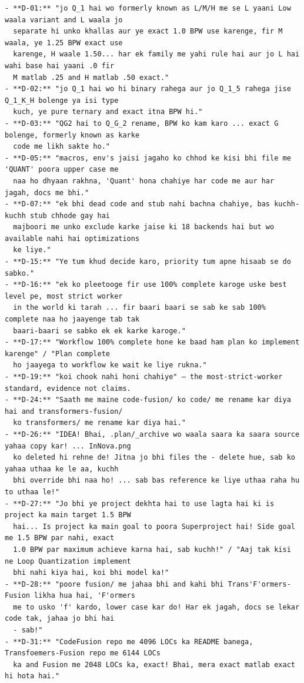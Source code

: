 \begin{Verbatim}[breaklines,breakanywhere,fontsize=\footnotesize]
- **D-01:** "jo Q_1 hai wo formerly known as L/M/H me se L yaani Low waala variant and L waala jo
  separate hi unko khallas aur ye exact 1.0 BPW use karenge, fir M waala, ye 1.25 BPW exact use
  karenge, H waale 1.50... har ek family me yahi rule hai aur jo L hai wahi base hai yaani .0 fir
  M matlab .25 and H matlab .50 exact."
- **D-02:** "jo Q_1 hai wo hi binary rahega aur jo Q_1_5 rahega jise Q_1_K_H bolenge ya isi type
  kuch, ye pure ternary and exact itna BPW hi."
- **D-03:** "QG2 hai to Q_G_2 rename, BPW ko kam karo ... exact G bolenge, formerly known as karke
  code me likh sakte ho."
- **D-05:** "macros, env's jaisi jagaho ko chhod ke kisi bhi file me 'QUANT' poora upper case me
  naa ho dhyaan rakhna, 'Quant' hona chahiye har code me aur har jagah, docs me bhi."
- **D-07:** "ek bhi dead code and stub nahi bachna chahiye, bas kuchh-kuchh stub chhode gay hai
  majboori me unko exclude karke jaise ki 18 backends hai but wo available nahi hai optimizations
  ke liye."
- **D-15:** "Ye tum khud decide karo, priority tum apne hisaab se do sabko."
- **D-16:** "ek ko pleetooge fir use 100% complete karoge uske best level pe, most strict worker
  in the world ki tarah ... fir baari baari se sab ke sab 100% complete naa ho jaayenge tab tak
  baari-baari se sabko ek ek karke karoge."
- **D-17:** "Workflow 100% complete hone ke baad ham plan ko implement karenge" / "Plan complete
  ho jaayega to workflow ke wait ke liye rukna."
- **D-19:** "koi chook nahi honi chahiye" — the most-strict-worker standard, evidence not claims.
- **D-24:** "Saath me maine code-fusion/ ko code/ me rename kar diya hai and transformers-fusion/
  ko transformers/ me rename kar diya hai."
- **D-26:** "IDEA! Bhai, .plan/_archive wo waala saara ka saara source yahaa copy kar! ... InNova.png
  ko deleted hi rehne de! Jitna jo bhi files the - delete hue, sab ko yahaa uthaa ke le aa, kuchh
  bhi override bhi naa ho! ... sab bas reference ke liye uthaa raha hu to uthaa le!"
- **D-27:** "Jo bhi ye project dekhta hai to use lagta hai ki is project ka main target 1.5 BPW
  hai... Is project ka main goal to poora Superproject hai! Side goal me 1.5 BPW par nahi, exact
  1.0 BPW par maximum achieve karna hai, sab kuchh!" / "Aaj tak kisi ne Loop Quantization implement
  bhi nahi kiya hai, koi bhi model ka!"
- **D-28:** "poore fusion/ me jahaa bhi and kahi bhi Trans'F'ormers-Fusion likha hua hai, 'F'ormers
  me to usko 'f' kardo, lower case kar do! Har ek jagah, docs se lekar code tak, jahaa jo bhi hai
  - sab!"
- **D-31:** "CodeFusion repo me 4096 LOCs ka README banega, Transfoemers-Fusion repo me 6144 LOCs
  ka and Fusion me 2048 LOCs ka, exact! Bhai, mera exact matlab exact hi hota hai."


\end{Verbatim}
